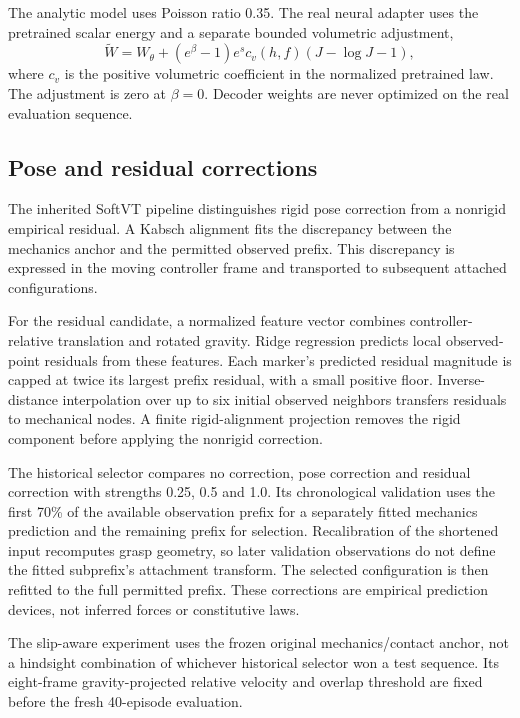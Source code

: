 \documentclass[10pt,twocolumn,letterpaper]{article}
\begin{document}
The analytic model uses Poisson ratio 0.35. The real neural adapter uses the pretrained scalar energy and a separate bounded volumetric adjustment,
\begin{equation}
\widetilde W=W_\theta+(e^\beta-1)e^s c_v(h,f)(J-\log J-1),
\end{equation}
where $c_v$ is the positive volumetric coefficient in the normalized pretrained law. The adjustment is zero at $\beta=0$. Decoder weights are never optimized on the real evaluation sequence.

\subsection{Pose and residual corrections}
The inherited SoftVT pipeline distinguishes rigid pose correction from a nonrigid empirical residual. A Kabsch alignment fits the discrepancy between the mechanics anchor and the permitted observed prefix. This discrepancy is expressed in the moving controller frame and transported to subsequent attached configurations.

For the residual candidate, a normalized feature vector combines controller-relative translation and rotated gravity. Ridge regression predicts local observed-point residuals from these features. Each marker's predicted residual magnitude is capped at twice its largest prefix residual, with a small positive floor. Inverse-distance interpolation over up to six initial observed neighbors transfers residuals to mechanical nodes. A finite rigid-alignment projection removes the rigid component before applying the nonrigid correction.

The historical selector compares no correction, pose correction and residual correction with strengths 0.25, 0.5 and 1.0. Its chronological validation uses the first 70\% of the available observation prefix for a separately fitted mechanics prediction and the remaining prefix for selection. Recalibration of the shortened input recomputes grasp geometry, so later validation observations do not define the fitted subprefix's attachment transform. The selected configuration is then refitted to the full permitted prefix. These corrections are empirical prediction devices, not inferred forces or constitutive laws.

The slip-aware experiment uses the frozen original mechanics/contact anchor, not a hindsight combination of whichever historical selector won a test sequence. Its eight-frame gravity-projected relative velocity and overlap threshold are fixed before the fresh 40-episode evaluation.
\end{document}
